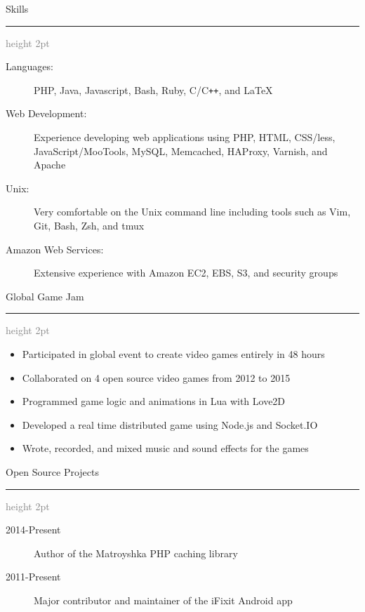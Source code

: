 \documentclass[letterpaper,11pt]{article}
\newcommand{\ressectiondivider}{
   \vspace{5pt}
   \textcolor{gray}{\hrule height 2pt}
}
\newcommand{\resitem}[1]{\item #1 \vspace{-2pt}}
\newcommand{\resheading}[1]{
   {\Large #1}
   \ressectiondivider
}
\begin{document}
\resheading{Skills}

\begin{description}
\item[Languages:]
PHP, Java, Javascript, Bash, Ruby, C/C{}\verb!++!, and \LaTeX
\item[Web Development:]
Experience developing web applications using PHP, HTML, CSS/less, JavaScript/MooTools, MySQL, Memcached, HAProxy, Varnish, and Apache
\item[Unix:]
Very comfortable on the Unix command line including tools such as Vim, Git, Bash, Zsh, and tmux
\item[Amazon Web Services:]
Extensive experience with Amazon EC2, EBS, S3, and security groups
\end{description}

\resheading{Global Game Jam}

\begin{itemize}
   \resitem{Participated in global event to create video games entirely in 48 hours}
   \resitem{Collaborated on 4 open source video games from 2012 to 2015}
   \resitem{Programmed game logic and animations in Lua with Love2D}
   \resitem{Developed a real time distributed game using Node.js and Socket.IO}
   \resitem{Wrote, recorded, and mixed music and sound effects for the games}
\end{itemize}

\resheading{Open Source Projects}

\begin{description}
\item[2014-Present] Author of the Matroyshka PHP caching library
\item[2011-Present] Major contributor and maintainer of the iFixit Android app
\end{description}
\end{document}
